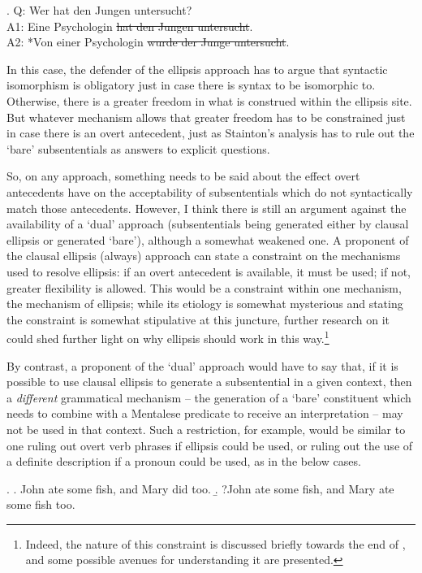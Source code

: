 \documentclass[doublespace]{umthesis}
\begin{document}
\ex. 	Q: Wer hat den Jungen untersucht?\\
	A1: Eine Psychologin \sout{hat den Jungen untersucht}.\\
	A2: *Von einer Psychologin \sout{wurde der Junge untersucht}.
	
In this case, the defender of the ellipsis approach has to argue that syntactic isomorphism is obligatory just in case there is syntax to be isomorphic to. Otherwise, there is a greater freedom in what is construed within the ellipsis site. But whatever mechanism allows that greater freedom has to be constrained just in case there is an overt antecedent, just as Stainton's analysis has to rule out the `bare' subsententials as answers to explicit questions.

So, on any approach, something needs to be said about the effect overt antecedents have on the acceptability of subsententials which do not syntactically match those antecedents. However, I think there is still an argument against the availability of a `dual' approach (subsententials being generated either by clausal ellipsis or generated `bare'), although a somewhat weakened one. A proponent of the clausal ellipsis (always) approach can state a constraint on the mechanisms used to resolve ellipsis: if an overt antecedent is available, it must be used; if not, greater flexibility is allowed. This would be a constraint within one mechanism, the mechanism of ellipsis; while its etiology is somewhat mysterious and stating the constraint is somewhat stipulative at this juncture, further research on it could shed further light on why ellipsis should work in this way.\footnote{Indeed, the nature of this constraint is discussed briefly towards the end of \cite{Me10}, and some possible avenues for understanding it are presented.}

By contrast, a proponent of the `dual' approach would have to say that, if it is possible to use clausal ellipsis to generate a subsentential in a given context, then a \emph{different} grammatical mechanism -- the generation of a `bare' constituent which needs to combine with a Mentalese predicate to receive an interpretation -- may not be used in that context. Such a restriction, for example, would be similar to one ruling out overt verb phrases if ellipsis could be used, or ruling out the use of a definite description if a pronoun could be used, as in the below cases.

\ex. 	\a. John ate some fish, and Mary did too.
	\b. ?John ate some fish, and Mary ate some fish too.
	
\end{document}
